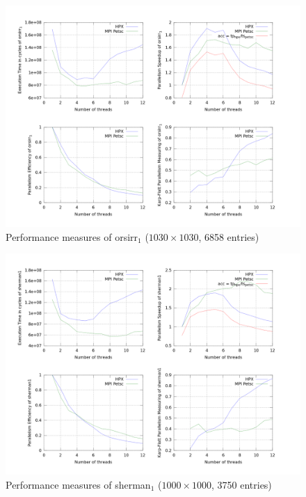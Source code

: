 \documentclass[smallextended]{svjour3}
\begin{document}
\begin{figure}[h!]
\begin{center}
\includegraphics[scale=0.25]{Images/orsirr1.png}
\end{center}
\caption{Performance measures of orsirr$_1$ ($1030\times1030$, 6858 entries)}
\label{orsirr_1}
\end{figure}

\begin{figure}[h!]
\begin{center}
\includegraphics[scale=0.25]{Images/sherman1.png}
\end{center}
\caption{Performance measures of sherman$_1$ ($1000\times1000$, 3750 entries)}
\label{sherman1}
\end{figure}
\end{document}
